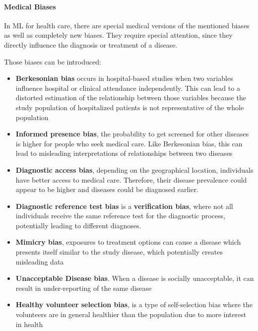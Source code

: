 \documentclass[12pt, a4paper, oneside]{book}   	%
\begin{document}
			\paragraph{Medical Biases}
			In ML for health care, there are special medical versions of the mentioned biases as well as completely new biases. They require special attention, since they directly influence the diagnosis or treatment of a disease.
			
			Those biases can be introduced:
			\begin{itemize}
				\item \textbf{Berkesonian bias} occurs in hospital-based studies when two variables influence hospital or clinical attendance independently. This can lead to a distorted estimation of the relationship between those variables because the study population of hospitalized patients is not representative of the whole population \autocite{Chakraborty_2024, c3, c7}
				\item \textbf{Informed presence bias}, the probability to get screened for other diseases is higher for people who seek medical care. Like Berkesonian bias, this can lead to misleading interpretations of relationships between two diseases \autocite{Chakraborty_2024, c27, c23}
				\item \textbf{Diagnostic access bias}, depending on the geographical location, individuals have better access to medical care. Therefore, their disease prevalence could appear to be higher and diseases could be diagnosed earlier. \autocite{Chakraborty_2024, c19-c21}
				\item \textbf{Diagnostic reference test bias} is a \textbf{verification bias}, where not all individuals receive the same reference test for the diagnostic process, potentially leading to different diagnoses. \autocite{Chakraborty_2024, c21}
				\item \textbf{Mimicry bias}, exposures to treatment options can cause a disease which presents itself similar to the study disease, which potentially creates misleading data \autocite{Chakraborty_2024, c28, c25}
				\item \textbf{Unacceptable Disease bias}. When a disease is socially unacceptable, it can result in under-reporting of the same disease \autocite{Chakraborty_2024, c30, c27}
				\item \textbf{Healthy volunteer selection bias}, is a type of self-selection bias where the volunteers are in general healthier than the population due to more interest in health \autocite{Delgado-Rodríguez_2004}
			\end{itemize}
			
\end{document}
